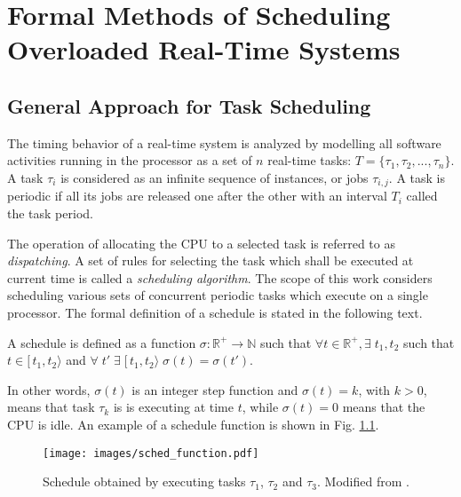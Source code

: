 \chapter{Formal Methods of Scheduling Overloaded Real-Time Systems}
\label{fm}
\section{General Approach for Task Scheduling}
The timing behavior of a real-time system is analyzed by modelling all software activities running in the processor as a set of $n$ real-time tasks: $T = \{\tau_1, \tau_2, ..., \tau_n\}$.
A task $\tau_i$ is considered as an infinite sequence of instances, or jobs $\tau_{i,j}$.
A task is periodic if all its jobs are released one after the other with an interval $T_i$ called the task period.

The operation of allocating the CPU to a selected task is referred to as \textit{dispatching}.
A set of rules for selecting the task which shall be executed at current time is called a 
\textit{scheduling algorithm}.
The scope of this work considers scheduling various sets of concurrent periodic tasks which execute on a single processor.
The formal definition of a schedule is stated in the following text.
\begin{mydef}
A schedule is defined as a function $\sigma : \mathbb{R}^{+} \rightarrow \mathbb{N}$ such that 
$\forall t \in \mathbb{R}^{+}, \exists \; t_1, t_2$ such that $t \in [\, t_1, t_2 \rangle$ and 
$\forall \; t' \; \exists \; [\, t_1, t_2 \rangle \; \sigma(t) = \sigma(t')$.
\end{mydef}
In other words, $\sigma(t)$ is an integer step function and $\sigma(t) = k$, with $k > 0$, means that task $\tau_k$ is is executing at time $t$, while $\sigma(t) = 0$ means that the CPU is idle.
An example of a schedule function is shown in Fig. \ref{schedule_function}.
\begin{figure}[ht]
    \centering
    \texttt{[image: images/sched\_function.pdf]}
    \caption{Schedule obtained by executing tasks $\tau_1$, $\tau_2$ and $\tau_3$. Modified from \cite{buttazzo2011hard}.}
    \label{schedule_function}
\end{figure}


